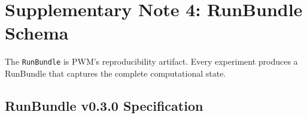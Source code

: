 \documentclass[11pt]{article}
\begin{document}
\newpage

\section{Supplementary Note 4: RunBundle Schema}
\label{sec:runbundle}

The \texttt{RunBundle} is PWM's reproducibility artifact.  Every experiment
produces a RunBundle that captures the complete computational state.

\subsection{RunBundle v0.3.0 Specification}
\end{document}
